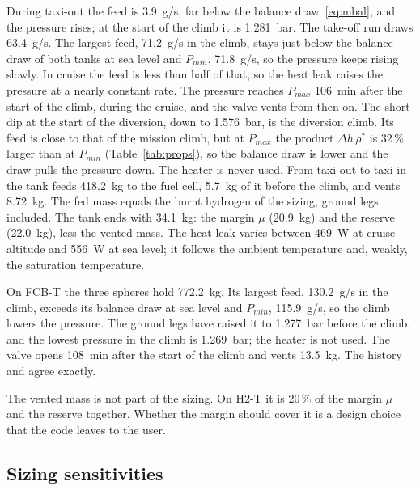 \documentclass[a4paper,11pt]{article}
\begin{document}
During taxi-out the feed is \SI{3.9}{g/s}, far below the balance draw~\eqref{eq:mbal}, and
the pressure rises; at the start of the climb it is \SI{1.281}{bar}. The take-off run draws
\SI{63.4}{g/s}. The largest feed, \SI{71.2}{g/s} in the climb, stays just below the balance
draw of both tanks at sea level and $P_{min}$, \SI{71.8}{g/s}, so the pressure keeps rising
slowly. In cruise the feed is less than half of that, so the heat leak raises the pressure at
a nearly constant rate. The pressure reaches $P_{max}$ \SI{106}{min} after the start of the
climb, during the cruise, and the valve vents from then on. The short dip at the start of the
diversion, down to \SI{1.576}{bar}, is the diversion climb. Its feed is close to that of the
mission climb, but at $P_{max}$ the product $\Delta h\,\rho^*$ is 32\,\% larger than at
$P_{min}$ (Table~\ref{tab:props}), so the balance draw is lower and the draw pulls the
pressure down. The heater is never used. From taxi-out to taxi-in the tank feeds
\SI{418.2}{kg} to the fuel cell, \SI{5.7}{kg} of it before the climb, and vents
\SI{8.72}{kg}. The fed mass equals the burnt hydrogen of the sizing, ground legs included. The
tank ends with \SI{34.1}{kg}: the margin $\mu$ (\SI{20.9}{kg}) and the reserve
(\SI{22.0}{kg}), less the vented mass. The heat leak varies between \SI{469}{W} at cruise
altitude and \SI{556}{W} at sea level; it follows the ambient temperature and, weakly, the
saturation temperature.

On FCB-T the three spheres hold \SI{772.2}{kg}. Its largest feed, \SI{130.2}{g/s} in the
climb, exceeds its balance draw at sea level and $P_{min}$, \SI{115.9}{g/s}, so the climb
lowers the pressure. The ground legs have raised it to \SI{1.277}{bar} before the climb, and
the lowest pressure in the climb is \SI{1.269}{bar}; the heater is not used. The valve opens
\SI{108}{min} after the start of the climb and vents \SI{13.5}{kg}. The 
history and  agree exactly.

The vented mass is not part of the sizing. On H2-T it is 20\,\% of the margin $\mu$ and
the reserve together. Whether the margin should cover it is a design choice that the code leaves to
the user.

\subsection{Sizing sensitivities}\label{sec:sens}
\end{document}
